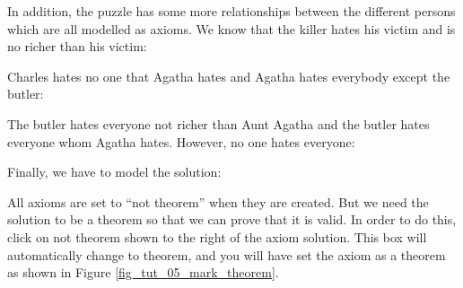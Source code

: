 In addition, the puzzle has some more relationships between the different persons which are all modelled as axioms. We know that the killer hates his victim and is no richer than his victim:


Charles hates no one that Agatha hates and Agatha hates everybody except the butler:


The butler hates everyone not richer than Aunt Agatha and the butler hates everyone whom Agatha hates. However, no one hates everyone:


Finally, we have to model the solution:


All axioms are set to ``not theorem'' when they are created. But we need the solution to be a theorem so that we can prove that it is valid. In order to do this, click on \textsf{not theorem} shown to the right of the axiom \textsf{solution}. This box will automatically change to \textsf{theorem}, and you will have set the axiom as a theorem as shown in Figure \ref{fig_tut_05_mark_theorem}.

